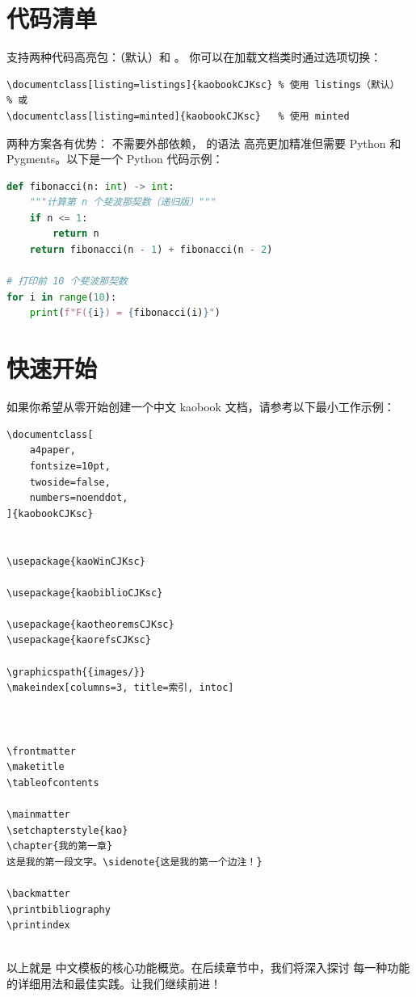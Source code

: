 \section{代码清单}

 支持两种代码高亮包：（默认）和 。
你可以在加载文档类时通过选项切换：

\begin{lstlisting}[caption=选择代码包，language=TeX]
\documentclass[listing=listings]{kaobookCJKsc} % 使用 listings（默认）
% 或
\documentclass[listing=minted]{kaobookCJKsc}   % 使用 minted
\end{lstlisting}


两种方案各有优势： 不需要外部依赖， 的语法
高亮更加精准但需要 Python 和 Pygments。以下是一个 Python 代码示例：

\begin{lstlisting}[language=Python, caption=一个 Python 示例]
def fibonacci(n: int) -> int:
    """计算第 n 个斐波那契数（递归版）"""
    if n <= 1:
        return n
    return fibonacci(n - 1) + fibonacci(n - 2)

# 打印前 10 个斐波那契数
for i in range(10):
    print(f"F({i}) = {fibonacci(i)}")
\end{lstlisting}


\section{快速开始}

如果你希望从零开始创建一个中文 kaobook 文档，请参考以下最小工作示例：

\begin{lstlisting}[caption=最小工作示例（main.tex）]
\documentclass[
    a4paper,
    fontsize=10pt,
    twoside=false,
    numbers=noenddot,
]{kaobookCJKsc}


\usepackage{kaoWinCJKsc}

\usepackage{kaobiblioCJKsc}

\usepackage{kaotheoremsCJKsc}
\usepackage{kaorefsCJKsc}

\graphicspath{{images/}}
\makeindex[columns=3, title=索引, intoc]



\frontmatter
\maketitle
\tableofcontents

\mainmatter
\setchapterstyle{kao}
\chapter{我的第一章}
这是我的第一段文字。\sidenote{这是我的第一个边注！}

\backmatter
\printbibliography
\printindex


\end{lstlisting}


以上就是  中文模板的核心功能概览。在后续章节中，我们将深入探讨
每一种功能的详细用法和最佳实践。让我们继续前进！

\endinput
